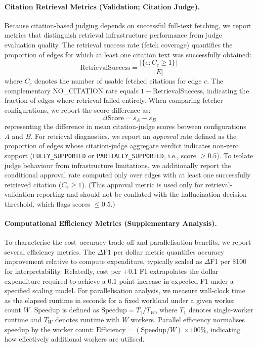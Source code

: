 \paragraph{Citation Retrieval Metrics (Validation; Citation Judge).}
Because citation-based judging depends on successful full-text fetching, we report metrics that distinguish retrieval infrastructure performance from judge evaluation quality. The retrieval success rate (fetch coverage) quantifies the proportion of edges for which at least one citation text was successfully obtained:
\begin{equation}
    \text{RetrievalSuccess} = \frac{|\{e : C_e \ge 1\}|}{|E|}
\end{equation}
where $C_e$ denotes the number of usable fetched citations for edge $e$. The complementary NO\_CITATION rate equals $1-\text{RetrievalSuccess}$, indicating the fraction of edges where retrieval failed entirely. When comparing fetcher configurations, we report the score difference as:
\begin{equation}
    \Delta \text{Score} = \overline{s}_{A} - \overline{s}_{B}
\end{equation}
representing the difference in mean citation-judge scores between configurations $A$ and $B$. For retrieval diagnostics, we report an \emph{approval} rate defined as the proportion of edges whose citation-judge aggregate verdict indicates non-zero support (\texttt{FULLY\_SUPPORTED} or \texttt{PARTIALLY\_SUPPORTED}, i.e., score $\ge 0.5$). To isolate judge behaviour from infrastructure limitations, we additionally report the conditional approval rate computed only over edges with at least one successfully retrieved citation ($C_e \ge 1$). (This approval metric is used only for retrieval-validation reporting and should not be conflated with the hallucination decision threshold, which flags scores $\le 0.5$.)

\paragraph{Computational Efficiency Metrics (Supplementary Analysis).}
To characterise the cost--accuracy trade-off and parallelisation benefits, we report several efficiency metrics. The $\Delta$F1 per dollar metric quantifies accuracy improvement relative to compute expenditure, typically scaled as $\Delta$F1 per \$100 for interpretability. Relatedly, cost per +0.1 F1 extrapolates the dollar expenditure required to achieve a 0.1-point increase in expected F1 under a specified scaling model. For parallelisation analysis, we measure wall-clock time as the elapsed runtime in seconds for a fixed workload under a given worker count $W$. Speedup is defined as $\text{Speedup} = T_1/T_W$, where $T_1$ denotes single-worker runtime and $T_W$ denotes runtime with $W$ workers. Parallel efficiency normalises speedup by the worker count: $\text{Efficiency} = (\text{Speedup}/W)\times 100\%$, indicating how effectively additional workers are utilised.

